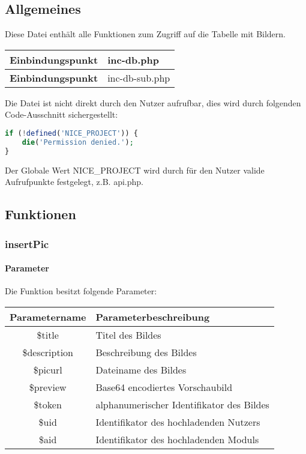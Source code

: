 \subsection{Allgemeines} Diese Datei enthält alle Funktionen zum Zugriff auf die Tabelle mit Bildern.
\begin{table}[H]
	\begin{tabular}{|c|p{11cm}|}
		\hline
		\textbf{Einbindungspunkt} & inc-db.php \\ \hline
		\textbf{Einbindungspunkt} & inc-db-sub.php \\ \hline
	\end{tabular}
\end{table}
Die Datei ist nicht direkt durch den Nutzer aufrufbar, dies wird durch folgenden Code-Ausschnitt sichergestellt:
\begin{lstlisting}[language=php]
if (!defined('NICE_PROJECT')) {
	die('Permission denied.');
}
\end{lstlisting}
Der Globale Wert {\glqq NICE\_PROJECT\grqq} wird durch für den Nutzer valide Aufrufpunkte festgelegt, z.B. {\glqq api.php\grqq}.
\newpage
\subsection{Funktionen}
\subsubsection{insertPic}
\paragraph{Parameter} Die Funktion besitzt folgende Parameter:
\begin{table}[H]
	\begin{tabular}{|c|p{11cm}|}
		\hline
		\textbf{Parametername} & \textbf{Parameterbeschreibung} \\ \hline
		\$title       & Titel des Bildes \\ \hline
		\$description & Beschreibung des Bildes \\ \hline
		\$picurl      & Dateiname des Bildes \\ \hline
		\$preview     & Base64 encodiertes Vorschaubild \\ \hline
		\$token       & alphanumerischer Identifikator des Bildes \\ \hline
		\$uid         & Identifikator des hochladenden Nutzers \\ \hline
		\$aid         & Identifikator des hochladenden Moduls \\ \hline
	\end{tabular}
\end{table}
